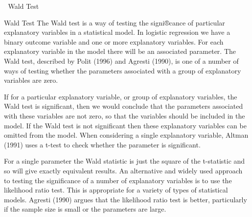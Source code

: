 


Wald Test

Wald Test
The Wald test is a way of testing the signi®cance of particular explanatory variables in a statistical model. In logistic regression we have a binary outcome variable and one or more explanatory variables. For each explanatory variable in the model there will be an associated parameter.
The Wald test, described by Polit (1996) and Agresti (1990), is one of a number of ways of testing whether the parameters associated with a group of
explanatory variables are zero.

If for a particular explanatory variable, or group of explanatory variables, the Wald test is significant, then we would conclude that the parameters associated with these variables are not zero, so that the variables should be included in the model. If the Wald test is not significant then these explanatory variables can be omitted from the model. When considering a single explanatory variable, Altman (1991) uses a t-test to check whether the parameter is significant. 

For a single parameter the Wald statistic is just the square of the t-statistic and so will give exactly equivalent results.
An alternative and widely used approach to testing the significance of a number of explanatory variables is to use the likelihood ratio test. This is
appropriate for a variety of types of statistical models. Agresti (1990) argues that the likelihood ratio test is better, particularly if the sample size is small or the parameters are large.


